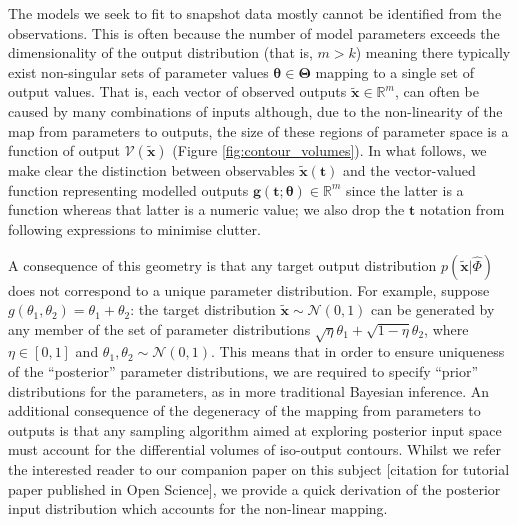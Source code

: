 \documentclass[10pt,letterpaper]{article}
\begin{document}
The models we seek to fit to snapshot data mostly cannot be identified from the observations. This is often because the number of model parameters exceeds the dimensionality of the output distribution (that is, $m>k$) meaning there typically exist non-singular sets of parameter values $\boldsymbol{\theta} \in \boldsymbol{\Theta}$ mapping to a single set of output values. That is, each vector of observed outputs $\tilde{\boldsymbol{x}}\in\mathbb{R}^m$, can often be caused by many combinations of inputs although, due to the non-linearity of the map from parameters to outputs, the size of these regions of parameter space is a function of output $\mathcal{V}(\tilde{\boldsymbol{x}})$ (Figure \ref{fig:contour_volumes}). In what follows, we make clear the distinction between observables $\tilde{\boldsymbol{x}}(\boldsymbol{t})$ and the vector-valued function representing modelled outputs $\boldsymbol{g}(\boldsymbol{t}; \boldsymbol{\theta})\in\mathbb{R}^m$ since the latter is a function whereas that latter is a numeric value; we also drop the $\boldsymbol{t}$ notation from following expressions to minimise clutter.

A consequence of this geometry is that any target output distribution $p(\tilde{\boldsymbol{x}}|\hat{\Phi})$ does not correspond to a unique parameter distribution. For example, suppose $g(\theta_1, \theta_2) = \theta_1 + \theta_2$: the target distribution $\tilde{\boldsymbol{x}}\sim \mathcal{N}(0, 1)$ can be generated by any member of the set of parameter distributions $\sqrt{\eta} \theta_1 + \sqrt{1 - \eta} \theta_2$, where $\eta\in [0, 1]$ and $\theta_1, \theta_2 \sim \mathcal{N}(0, 1)$. This means that in order to ensure uniqueness of the ``posterior'' parameter distributions, we are required to specify ``prior'' distributions for the parameters, as in more traditional Bayesian inference. An additional consequence of the degeneracy of the mapping from parameters to outputs is that any sampling algorithm aimed at exploring posterior input space must account for the differential volumes of iso-output contours. Whilst we refer the interested reader to our companion paper on this subject [citation for tutorial paper published in Open Science], we provide a quick derivation of the posterior input distribution which accounts for the non-linear mapping.
\end{document}

